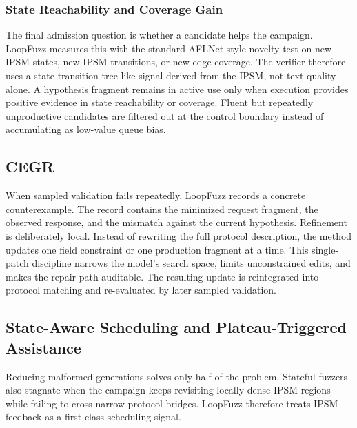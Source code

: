 \documentclass[conference]{IEEEtran}
\begin{document}
\subsubsection{State Reachability and Coverage Gain}
The final admission question is whether a candidate helps the campaign. LoopFuzz measures this with the standard AFLNet-style novelty test on new IPSM states, new IPSM transitions, or new edge coverage. The verifier therefore uses a state-transition-tree-like signal derived from the IPSM, not text quality alone. A hypothesis fragment remains in active use only when execution provides positive evidence in state reachability or coverage. Fluent but repeatedly unproductive candidates are filtered out at the control boundary instead of accumulating as low-value queue bias.

\subsection{CEGR}
When sampled validation fails repeatedly, LoopFuzz records a concrete counterexample. The record contains the minimized request fragment, the observed response, and the mismatch against the current hypothesis. Refinement is deliberately local. Instead of rewriting the full protocol description, the method updates one field constraint or one production fragment at a time. This single-patch discipline narrows the model's search space, limits unconstrained edits, and makes the repair path auditable. The resulting update is reintegrated into protocol matching and re-evaluated by later sampled validation.

\subsection{State-Aware Scheduling and Plateau-Triggered Assistance}
Reducing malformed generations solves only half of the problem. Stateful fuzzers also stagnate when the campaign keeps revisiting locally dense IPSM regions while failing to cross narrow protocol bridges. LoopFuzz therefore treats IPSM feedback as a first-class scheduling signal.
\end{document}
